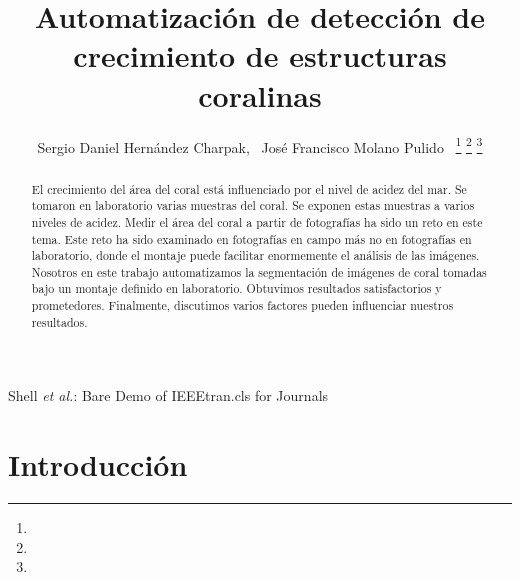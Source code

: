 \documentclass[journal]{IEEEtran}
\begin{document}
\title{Automatización de detección de crecimiento de estructuras coralinas}

\author{Sergio Daniel Hernández Charpak,~\IEEEmembership{}
        José Francisco Molano Pulido~\IEEEmembership{}%
\thanks{}%
\thanks{}%
\thanks{}}

%
{Shell \MakeLowercase{\textit{et al.}}: Bare Demo of IEEEtran.cls for Journals}

\maketitle


\begin{abstract}
El crecimiento del área del coral está influenciado por el nivel de acidez del mar. 
Se tomaron en laboratorio varias muestras del coral. Se exponen estas muestras a
varios niveles de acidez. Medir el área del coral a partir de fotografías ha sido un reto en
este tema. Este reto ha sido examinado en fotografías en campo más no en fotografías en
laboratorio, donde el montaje puede facilitar enormemente el análisis de las imágenes. Nosotros
en este trabajo automatizamos la segmentación de imágenes de coral tomadas bajo un montaje
definido en laboratorio. Obtuvimos resultados satisfactorios y prometedores. Finalmente,
discutimos varios factores pueden influenciar nuestros resultados.
\end{abstract}

\IEEEpeerreviewmaketitle

\section{Introducción}
\end{document}
